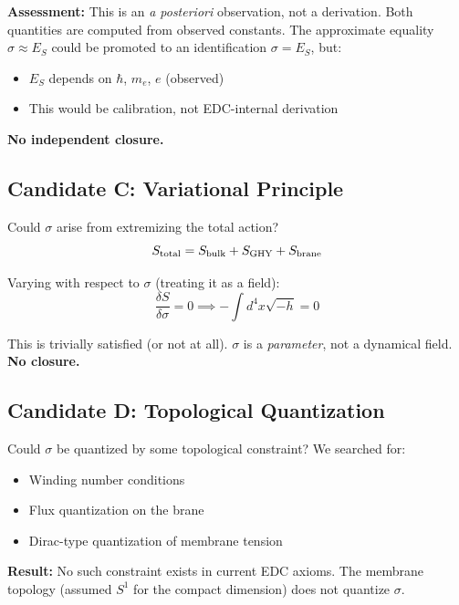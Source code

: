 \documentclass[11pt,a4paper]{article}
\begin{document}
\textbf{Assessment:} This is an \textit{a posteriori} observation, not a
derivation. Both quantities are computed from observed constants. The
approximate equality $\sigma \approx E_S$ could be promoted to an
identification $\sigma = E_S$, but:
\begin{itemize}
\item $E_S$ depends on $\hbar$, $m_e$, $e$ (observed)
\item This would be calibration, not EDC-internal derivation
\end{itemize}

\textbf{No independent closure.}

\subsection{Candidate C: Variational Principle}

Could $\sigma$ arise from extremizing the total action?
\begin{equation}
S_{\rm total} = S_{\rm bulk} + S_{\rm GHY} + S_{\rm brane}
\end{equation}

Varying with respect to $\sigma$ (treating it as a field):
\begin{equation}
\frac{\delta S}{\delta \sigma} = 0 \implies -\int d^4x \sqrt{-h} = 0
\end{equation}

This is trivially satisfied (or not at all). $\sigma$ is a \textit{parameter},
not a dynamical field. \textbf{No closure.}

\subsection{Candidate D: Topological Quantization}

Could $\sigma$ be quantized by some topological constraint? We searched for:
\begin{itemize}
\item Winding number conditions
\item Flux quantization on the brane
\item Dirac-type quantization of membrane tension
\end{itemize}

\textbf{Result:} No such constraint exists in current EDC axioms.
The membrane topology (assumed $S^1$ for the compact dimension) does not
quantize $\sigma$.

\end{document}
